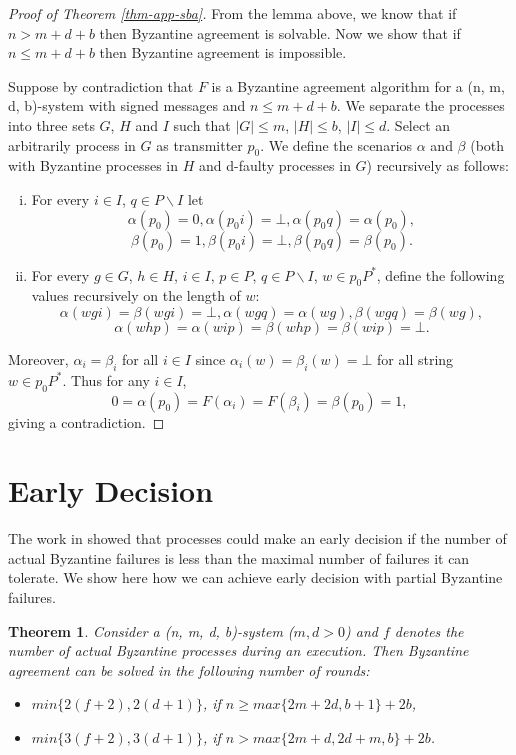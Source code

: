 \documentclass[11pt,conference,compsoc,onecolumn,romanappendices]{IEEEtran}
\newcommand{\nocomma}{}
\newenvironment{enumerateroman}{\begin{enumerate}[i.] }{\end{enumerate}}
\newtheorem{theorem}{Theorem}
\begin{document}
\begin{proof}[Proof of Theorem \ref{thm-app-sba}]
  From the lemma above, we know that if $n > m + d + b$ then Byzantine
  agreement is solvable. Now we show that if $n \leqslant m + d + b$ then Byzantine
  agreement is impossible.
  
  Suppose by contradiction that $F$ is a Byzantine agreement algorithm for a
  (n, m, d, b)-system with signed messages and $n \leqslant m + d + b$. We separate
  the processes into three sets $G$, $H$ and $I$ such that $| G | \leqslant m$, $| H |
  \leqslant b$, $| I | \leqslant d$. Select an arbitrarily process in $G$ as transmitter $p_0$.
  We define the scenarios $\alpha$ and $\beta$ (both with Byzantine processes in $H$ and d-faulty processes in $G$) recursively as follows:
  \begin{enumerateroman}
    \item For every $i \in I$, $q \in P \backslash I$ let
    \[ \alpha (p_0) = 0, \alpha (p_0 i) = \bot, \alpha (p_0 q) = \alpha (p_0),
    \]
    \[ \beta (p_0) = 1, \beta (p_0 i) = \bot, \beta (p_0 q) = \beta (p_0) . \]
    \item For every $g \in G$, $h \in H$, $i \in I$, $p \in P$, $q \in P \backslash I$,
    $w \in p_0 P^{\ast}$, define the following values recursively on the
    length of $w$:
    \[ \alpha (w g i) = \beta (w g i) = \bot \nocomma, \alpha (w g q) = \alpha
       (w g) \nocomma, \beta (w g q) = \beta (w g), \]
    \[ \alpha (w h p) = \alpha (w i p) = \beta (w h p) = \beta (w i p) = \bot
       . \]
  \end{enumerateroman}
Moreover, $\alpha_i = \beta_i$ for all $i \in I$ since $\alpha_i (w) =
  \beta_i (w) = \bot$ for all string $w \in p_0 P^{\ast}$. Thus for any $i \in
  I$,
  \[ 0 = \alpha (p_0) = F (\alpha_i) = F (\beta_i) = \beta (p_0) = 1, \]
  giving a contradiction.
\end{proof}

\section{Early Decision}\label{app-early}

The work in \cite{dolev1982polynomial,krings1999byzantine} showed that processes
could make an early decision if the number of actual Byzantine failures is less than the
maximal number of failures it can tolerate. We show here how we can achieve early
decision with partial Byzantine failures.

\begin{theorem}
Consider a (n, m, d, b)-system ($m, d > 0$) and $f$ denotes the number of actual
Byzantine processes during an execution. Then Byzantine agreement can be solved in
the following number of rounds:
\begin{itemize}
\item $min \{ 2(f + 2), 2(d + 1) \}$, if $n \geqslant max\{2m+2d, b + 1\} + 2b$,
\item $min \{ 3(f + 2), 3(d + 1) \}$, if $n > max\{2m+d, 2d+m, b\} + 2b$.
\end{itemize}
\end{theorem}
\end{document}

